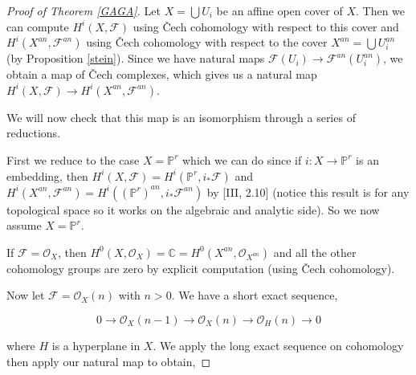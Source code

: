 \documentclass[a4paper]{article}
\newcommand{\F}{\mathcal{F}}
\newcommand{\OO}{\mathcal{O}}
\newcommand{\PP}{\mathbb{P}}
\newcommand{\C}{\mathbb{C}}
\numberwithin{theorem}{section}
\numberwithin{equation}{section}
\begin{document}
\begin{proof}[Proof of Theorem \ref{GAGA}]

Let $X = \bigcup U_i$ be an affine open cover of $X$. Then we can compute $H^i(X,\F)$ using Čech cohomology with respect to this cover and $H^i(X^{an},\F^{an})$ using Čech cohomology with respect to the cover $X^{an} = \bigcup U^{an}_i$ (by Proposition \ref{stein}). Since we have natural maps $\F(U_i) \rightarrow \F^{an}(U_i^{an})$, we obtain a map of Čech complexes, which gives us a natural map $H^i(X,\mathcal{F}) \rightarrow H^i(X^{an},\F^{an})$.

We will now check that this map is an isomorphism through a series of reductions.

First we reduce to the case $X = \PP^r$ which we can do since if $i: X \rightarrow \PP^r$ is an embedding, then $H^i(X,\F) = H^i(\PP^r,i_* \F)$ and $H^i(X^{an},\F^{an}) = H^i((\PP^r)^{an},i_* \F^{an})$ by \cite{Hartshorne77}[III, 2.10] (notice this result is for any topological space so it works on the algebraic and analytic side). So we now assume $X = \PP^r$.

If $\F = \OO_X$, then $H^0(X,\OO_X) = \C = H^0(X^{an}, \OO_{X^{an}})$ and all the other cohomology groups are zero by explicit computation (using Čech cohomology).

Now let $\F = \OO_X(n)$ with $n > 0$. We have a short exact sequence,

$$ 0 \rightarrow \OO_X(n-1) \rightarrow \OO_X(n) \rightarrow \OO_H(n) \rightarrow 0 $$

where $H$ is a hyperplane in $X$. We apply the long exact sequence on cohomology then apply our natural map to obtain, 

\vspace{0.5 cm}



\end{proof}
\end{document}
